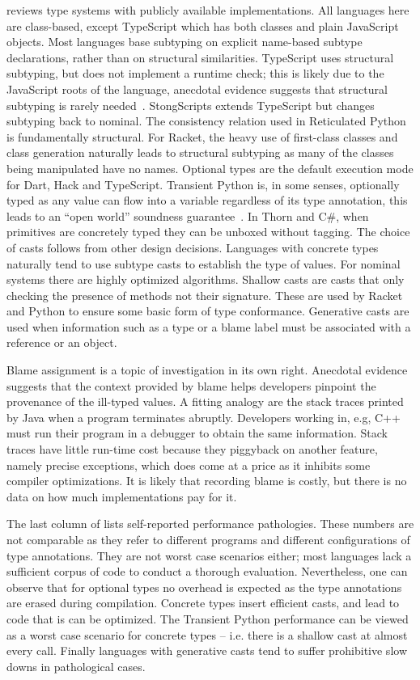 \documentclass[a4paper,USenglish]{tex/lipics-v2016}
\begin{document}
\noindent
{} reviews type systems with publicly available
implementations. All languages here are class-based, except TypeScript which
has both classes and plain JavaScript objects. Most languages base subtyping
on explicit name-based subtype declarations, rather than on structural
similarities.  TypeScript uses structural subtyping, but does not implement
a runtime check; this is likely due to the JavaScript roots of the language,
anecdotal evidence suggests that structural subtyping is rarely
needed~\cite{ecoop15}. StongScripts extends TypeScript but changes subtyping
back to nominal.  The consistency relation used in Reticulated Python is
fundamentally structural.  For Racket, the heavy use of first-class classes
and class generation naturally leads to structural subtyping as many of the
classes being manipulated have no names.  Optional types are the default
execution mode for Dart, Hack and TypeScript.  Transient Python is, in some
senses, optionally typed as any value can flow into a variable regardless of
its type annotation, this leads to an ``open world'' soundness
guarantee~\cite{siek14}.  In Thorn and C\#, when primitives are concretely
typed they can be unboxed without tagging.  The choice of casts follows from
other design decisions. Languages with concrete types naturally tend to use
subtype casts to establish the type of values. For nominal systems there are
highly optimized algorithms. Shallow casts are casts that only checking the
presence of methods not their signature. These are used by Racket and Python
to ensure some basic form of type conformance. Generative casts are used
when information such as a type or a blame label must be associated with a
reference or an object.

Blame assignment is a topic of investigation in its own right. Anecdotal
evidence suggests that the context provided by blame helps developers
pinpoint the provenance of the ill-typed values. A fitting analogy are the
stack traces printed by Java when a program terminates abruptly. Developers
working in, e.g, C++ must run their program in a debugger to obtain the same
information. Stack traces have little run-time cost because they piggyback
on another feature, namely precise exceptions, which does come at a price as
it inhibits some compiler optimizations. It is likely that recording blame
is costly, but there is no data on how much implementations pay for it.

The last column of  lists self-reported performance
pathologies.  These numbers are not comparable as they refer to different
programs and different configurations of type annotations. They are not
worst case scenarios either; most languages lack a sufficient corpus of code
to conduct a thorough evaluation.  Nevertheless, one can observe that for
optional types no overhead is expected as the type annotations are erased
during compilation. Concrete types insert efficient casts, and lead to code
that is can be optimized.  The Transient Python performance can be viewed as
a worst case scenario for concrete types -- i.e. there is a shallow cast at
almost every call. Finally languages with generative casts tend to suffer
prohibitive slow downs in pathological cases.
\end{document}

